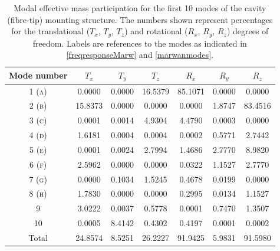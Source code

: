 \documentclass[../Thesis-IJspeert.tex]{subfiles}
\begin{document}
\begin{table}[h]
	\centering
	\begin{tabular}{ccccccc}
		\toprule
		{Mode number} & { ${T}_x$} & {${T}_y$} & {${T}_z$} & {${R}_x$} & {${R}_y$} & {${R}_z$} \\
		\midrule
		1 \textsc{(a)} & 0.0000 & 0.0000 & 16.5379 & 85.1071 & 0.0000 & 0.0000 \\
		2 \textsc{(b)} & 15.8373 & 0.0000 & 0.0000 & 0.0000 & 1.8747 & 83.4516 \\
		3 \textsc{(c)} & 0.0001 & 0.0014 & 4.9304 & 4.4790 & 0.0003 & 0.0000 \\
		4 \textsc{(d)} & 1.6181 & 0.0004 & 0.0004 & 0.0002 & 0.5771 & 2.7442 \\
		5 \textsc{(e)} & 0.0001 & 0.0024 & 2.7994 & 1.4686 & 2.7770 & 8.9820 \\
		6 \textsc{(f)} & 2.5962 & 0.0000 & 0.0000 & 0.0322 & 1.1527 & 2.7770 \\
		7 \textsc{(g)} & 0.0000 & 0.1034 & 1.5245 & 0.4678 & 0.0199 & 0.0000 \\
		8 \textsc{(h)} & 1.7830 & 0.0000 & 0.0000 & 0.2995 & 0.0134 & 1.1527 \\
		9 & 3.0222 & 0.0037 & 0.5778 & 0.0001 & 0.7470 & 1.3507 \\
		10 & 0.0005 & 8.4142 & 0.4302 & 0.4197 & 0.0001 & 0.0002 \\
		\midrule
		{Total} & 24.8574 & 8.5251 & 26.2227 & 91.9425 & 5.9831 & 91.5980 \\
		\bottomrule
	\end{tabular}
\caption[Percentages of modal effective mass for cavity (fibre-tip) mounting structure]{Modal effective mass participation for the first 10 modes of the cavity (fibre-tip) mounting structure. The numbers shown represent percentages for the translational (${T}_x$, ${T}_y$, ${T}_z$) and rotational (${R}_x$, ${R}_y$, ${R}_z$) degrees of freedom. Labels are references to the modes as indicated in \autoref{freqresponseMarw} and \autoref{marwanmodes}.}
	\label{modeparticipationM}
\end{table}
\end{document}
